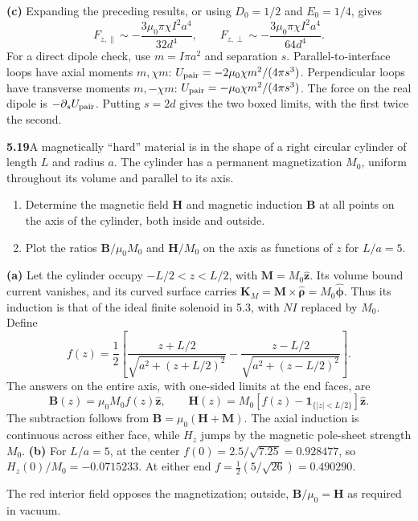 \textbf{(c)} Expanding the preceding results, or using
$D_0=1/2$ and $E_0=1/4$, gives
\[
\boxed{F_{z,\parallel}\sim-\frac{3\mu_0\pi\chi I^2a^4}{32d^4},
\qquad F_{z,\perp}\sim-\frac{3\mu_0\pi\chi I^2a^4}{64d^4}.}
\]
For a direct dipole check, use $m=I\pi a^2$ and separation $s$.
Parallel-to-interface loops have axial moments $m,\chi m$:
$U_{\rm pair}=-2\mu_0\chi m^2/(4\pi s^3)$.
Perpendicular loops have transverse moments $m,-\chi m$:
$U_{\rm pair}=-\mu_0\chi m^2/(4\pi s^3)$.
The force on the real dipole is $-\partial_sU_{\rm pair}$.
Putting $s=2d$ gives the two boxed limits, with the first twice the second.


\par\bigskip
\noindent\textbf{5.19}\quad A magnetically ``hard'' material is in the shape of a right circular cylinder of length $L$ and radius $a$. The cylinder has a permanent magnetization $M_{0}$, uniform throughout its volume and parallel to its axis.
\begin{enumerate}
\item[(a)] Determine the magnetic field $\mathbf{H}$ and magnetic induction $\mathbf{B}$ at all points on the axis of the cylinder, both inside and outside.
\item[(b)] Plot the ratios $\mathbf{B}/\mu_{0}M_{0}$ and $\mathbf{H}/M_{0}$ on the axis as functions of $z$ for $L/a=5$.
\end{enumerate}
\solution
\textbf{(a)} Let the cylinder occupy $-L/2<z<L/2$, with
$\mathbf M=M_0\widehat{\mathbf z}$.
Its volume bound current vanishes, and its curved surface carries
$\mathbf K_M=\mathbf M\times\widehat{\boldsymbol\rho}
=M_0\widehat{\boldsymbol\phi}$.
Thus its induction is that of the ideal finite solenoid in 5.3, with
$NI$ replaced by $M_0$. Define
\[
f(z)=\frac12\left[
\frac{z+L/2}{\sqrt{a^2+(z+L/2)^2}}
-\frac{z-L/2}{\sqrt{a^2+(z-L/2)^2}}\right].
\]
The answers on the entire axis, with one-sided limits at the end faces, are
\[
\boxed{\mathbf B(z)=\mu_0M_0f(z)\widehat{\mathbf z},\qquad
\mathbf H(z)=M_0[f(z)-\mathbf1_{\{|z|<L/2\}}]\widehat{\mathbf z}.}
\]
The subtraction follows from $\mathbf B=\mu_0(\mathbf H+\mathbf M)$.
The axial induction is continuous across either face, while $H_z$
jumps by the magnetic pole-sheet strength $M_0$.
\textbf{(b)} For $L/a=5$, at the center $f(0)=2.5/\sqrt{7.25}=0.928477$,
so $H_z(0)/M_0=-0.0715233$. At either end $f=\tfrac12(5/\sqrt{26})
=0.490290$.
\begin{center}

\end{center}
The red interior field opposes the magnetization; outside,
$\mathbf B/\mu_0=\mathbf H$ as required in vacuum.


